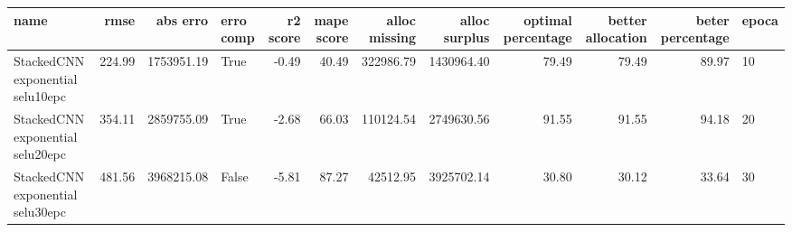 \begin{tabular}{lrrlrrrrrrrl}
\toprule
name & rmse & abs erro & erro comp & r2 score & mape score & alloc missing & alloc surplus & optimal percentage & better allocation & beter percentage & epoca \\
\midrule
StackedCNN exponential selu10epc & 224.99 & 1753951.19 & True & -0.49 & 40.49 & 322986.79 & 1430964.40 & 79.49 & 79.49 & 89.97 & 10 \\
StackedCNN exponential selu20epc & 354.11 & 2859755.09 & True & -2.68 & 66.03 & 110124.54 & 2749630.56 & 91.55 & 91.55 & 94.18 & 20 \\
StackedCNN exponential selu30epc & 481.56 & 3968215.08 & False & -5.81 & 87.27 & 42512.95 & 3925702.14 & 30.80 & 30.12 & 33.64 & 30 \\
\bottomrule
\end{tabular}
